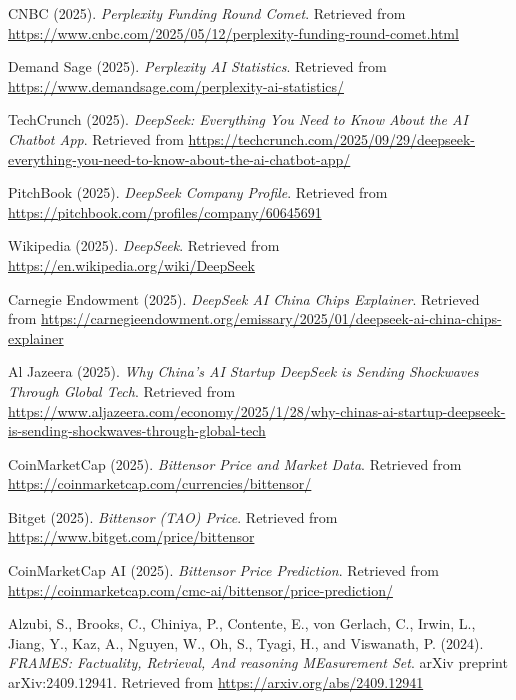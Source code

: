 \documentclass[10pt,a4paper]{article}
\begin{document}
\begin{thebibliography}{99}
CNBC (2025).
\textit{Perplexity Funding Round Comet}.
Retrieved from \url{https://www.cnbc.com/2025/05/12/perplexity-funding-round-comet.html}

Demand Sage (2025).
\textit{Perplexity AI Statistics}.
Retrieved from \url{https://www.demandsage.com/perplexity-ai-statistics/}

TechCrunch (2025).
\textit{DeepSeek: Everything You Need to Know About the AI Chatbot App}.
Retrieved from \url{https://techcrunch.com/2025/09/29/deepseek-everything-you-need-to-know-about-the-ai-chatbot-app/}

PitchBook (2025).
\textit{DeepSeek Company Profile}.
Retrieved from \url{https://pitchbook.com/profiles/company/60645691}

Wikipedia (2025).
\textit{DeepSeek}.
Retrieved from \url{https://en.wikipedia.org/wiki/DeepSeek}

Carnegie Endowment (2025).
\textit{DeepSeek AI China Chips Explainer}.
Retrieved from \url{https://carnegieendowment.org/emissary/2025/01/deepseek-ai-china-chips-explainer}

Al Jazeera (2025).
\textit{Why China's AI Startup DeepSeek is Sending Shockwaves Through Global Tech}.
Retrieved from \url{https://www.aljazeera.com/economy/2025/1/28/why-chinas-ai-startup-deepseek-is-sending-shockwaves-through-global-tech}

CoinMarketCap (2025).
\textit{Bittensor Price and Market Data}.
Retrieved from \url{https://coinmarketcap.com/currencies/bittensor/}

Bitget (2025).
\textit{Bittensor (TAO) Price}.
Retrieved from \url{https://www.bitget.com/price/bittensor}

CoinMarketCap AI (2025).
\textit{Bittensor Price Prediction}.
Retrieved from \url{https://coinmarketcap.com/cmc-ai/bittensor/price-prediction/}


Alzubi, S., Brooks, C., Chiniya, P., Contente, E., von Gerlach, C., Irwin, L., Jiang, Y., Kaz, A., Nguyen, W., Oh, S., Tyagi, H., and Viswanath, P. (2024).
\textit{FRAMES: Factuality, Retrieval, And reasoning MEasurement Set}.
arXiv preprint arXiv:2409.12941.
Retrieved from \url{https://arxiv.org/abs/2409.12941}


\end{thebibliography}
\end{document}
